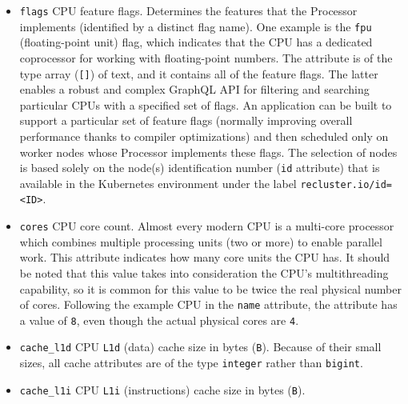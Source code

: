 \begin{itemize}
  \item \texttt{flags}
    \newline
    CPU feature flags.
    \newline
    Determines the features that the Processor implements (identified by a
    distinct flag name). One example is the \texttt{fpu} (floating-point unit) flag,
    which indicates that the CPU has a dedicated coprocessor for working with
    floating-point numbers.
    \newline
    The attribute is of the type array (\texttt{[]}) of text, and it contains
    all of the feature flags. The latter enables a robust and complex GraphQL API
    for filtering and searching particular CPUs with a specified set of flags.
    \newline
    An application can be built to support a particular set of feature flags (normally
    improving overall performance thanks to compiler optimizations) and then
    scheduled only on worker nodes whose Processor implements these flags. The selection
    of nodes is based solely on the node(s) identification number (\texttt{id}
    attribute) that is available in the Kubernetes environment under the label \texttt{recluster.io/id=<ID>}.

  \item \texttt{cores}
    \newline
    CPU core count.
    \newline
    Almost every modern CPU is a multi-core processor which combines multiple processing
    units (two or more) to enable parallel work. This attribute indicates how
    many core units the CPU has.
    \newline
    It should be noted that this value takes into consideration the CPU's multithreading
    capability, so it is common for this value to be twice the real physical
    number of cores.
    \newline
    Following the example CPU in the \texttt{name} attribute, the attribute has a
    value of \texttt{8}, even though the actual physical cores are \texttt{4}.

  \item \texttt{cache\_l1d}
    \newline
    CPU \texttt{L1d} (data) cache size in bytes (\texttt{B}).
    \newline
    Because of their small sizes, all cache attributes are of the type \texttt{integer}
    rather than \texttt{bigint}.

  \item \texttt{cache\_l1i}
    \newline
    CPU \texttt{L1i} (instructions) cache size in bytes (\texttt{B}).


\end{itemize}
